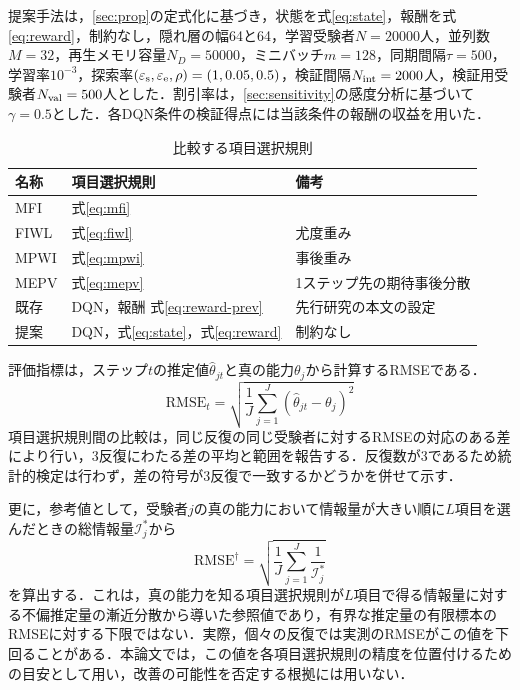 \documentclass[a4paper,12pt,oneside,openany]{jsbook}
\begin{document}
提案手法は，\ref{sec:prop}の定式化に基づき，状態を式\eqref{eq:state}，報酬を式\eqref{eq:reward}，制約なし，隠れ層の幅64と64，学習受験者$N=20000$人，並列数$M=32$，再生メモリ容量$N_D=50000$，ミニバッチ$m=128$，同期間隔$\tau=500$，学習率$10^{-3}$，探索率$(\varepsilon_{\rm s},\varepsilon_{\rm e},\rho)=(1,0.05,0.5)$，検証間隔$N_{\rm int}=2000$人，検証用受験者$N_{\rm val}=500$人とした．割引率は，\ref{sec:sensitivity}の感度分析に基づいて$\gamma=0.5$とした．各DQN条件の検証得点には当該条件の報酬の収益を用いた．

\begin{table}[t]
\centering
\caption{比較する項目選択規則}
\label{tab:methods}
\footnotesize
\setlength{\tabcolsep}{2pt}
\begin{tabular}{lll}
\hline
名称 & 項目選択規則 & 備考\\
\hline
MFI & 式\eqref{eq:mfi} & \\
FIWL & 式\eqref{eq:fiwl} & 尤度重み\\
MPWI & 式\eqref{eq:mpwi} & 事後重み\\
MEPV & 式\eqref{eq:mepv} & 1ステップ先の期待事後分散\\
既存 & DQN，報酬 式\eqref{eq:reward-prev} & 先行研究の本文の設定\\
提案 & DQN，式\eqref{eq:state}，式\eqref{eq:reward} & 制約なし\\
\hline
\end{tabular}
\end{table}

評価指標は，ステップ$t$の推定値$\hat\theta_{jt}$と真の能力$\theta_j$から計算するRMSEである．
\begin{equation}
 \mathrm{RMSE}_t=\sqrt{\frac{1}{J}\sum_{j=1}^{J}(\hat\theta_{jt}-\theta_j)^2}
 \label{eq:metrics}
\end{equation}
項目選択規則間の比較は，同じ反復の同じ受験者に対するRMSEの対応のある差により行い，3反復にわたる差の平均と範囲を報告する．反復数が3であるため統計的検定は行わず，差の符号が3反復で一致するかどうかを併せて示す．

更に，参考値として，受験者$j$の真の能力において情報量が大きい順に$L$項目を選んだときの総情報量$\mathcal{I}^*_j$から
\begin{equation}
 \mathrm{RMSE}^\dagger=\sqrt{\frac{1}{J}\sum_{j=1}^{J}\frac{1}{\mathcal{I}^*_j}}
 \label{eq:reference}
\end{equation}
を算出する．これは，真の能力を知る項目選択規則が$L$項目で得る情報量に対する不偏推定量の漸近分散から導いた参照値であり，有界な推定量の有限標本のRMSEに対する下限ではない．実際，個々の反復では実測のRMSEがこの値を下回ることがある．本論文では，この値を各項目選択規則の精度を位置付けるための目安として用い，改善の可能性を否定する根拠には用いない．
\end{document}
